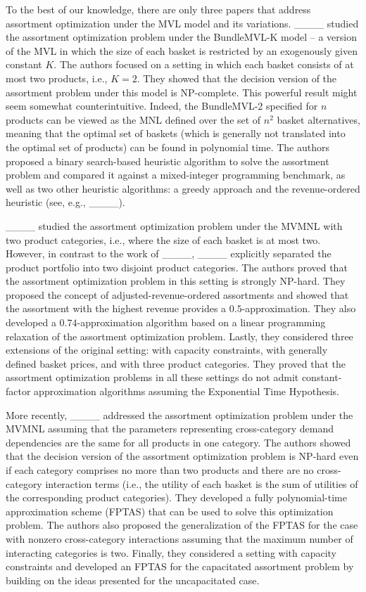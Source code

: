 To the best of our knowledge, there are only three papers that address assortment optimization under the MVL model and its variations. ____ studied the assortment optimization problem under the BundleMVL-K model -- a version of the MVL in which the size of each basket is restricted by an exogenously given constant $K$. The authors focused on a setting in which each basket consists of at most two products, i.e., $K=2$. They showed that the decision version of the assortment problem under this model is NP-complete. This powerful result might seem somewhat counterintuitive. Indeed, the BundleMVL-2 specified for $n$ products can be viewed as the MNL defined over the set of $n^2$ basket alternatives, meaning that the optimal set of baskets (which is generally not translated into the optimal set of products) can be found in polynomial time. The authors proposed a binary search-based heuristic algorithm to solve the assortment problem and compared it against a mixed-integer programming benchmark, as well as two other heuristic algorithms: a greedy approach and the revenue-ordered heuristic (see, e.g., ____). 
 
 ____ studied the assortment optimization problem under the MVMNL with two product categories, i.e., where the size of each basket is at most two. However, in contrast to the work of ____, ____ explicitly separated the product portfolio into two disjoint product categories. The authors proved that the assortment optimization problem in this setting is strongly NP-hard. They proposed the concept of adjusted-revenue-ordered assortments and showed that the assortment with the highest revenue provides a $0.5$-approximation. 
They also developed a $0.74$-approximation algorithm based on a linear programming relaxation of the assortment optimization problem. Lastly, they considered three extensions of the original setting: with capacity constraints, with generally defined basket prices, and with three product categories. They proved that the assortment optimization problems in all these settings do not admit constant-factor approximation algorithms assuming the Exponential Time Hypothesis.

More recently, ____ addressed the assortment optimization problem under the MVMNL assuming that the parameters representing cross-category demand dependencies are the same for all products in one category. The authors showed that 
 the decision version of the assortment optimization problem is NP-hard even if each category comprises no more than two products and there are no cross-category interaction terms (i.e., the utility of each basket is the sum of utilities of the corresponding product categories). They developed a fully polynomial-time approximation scheme (FPTAS) that can be used to solve this optimization problem. The authors also proposed the generalization of the FPTAS for the case with nonzero cross-category interactions assuming that the maximum number of interacting categories is two. Finally, they considered a setting with capacity constraints and developed an FPTAS for the capacitated assortment problem by building on the ideas presented for the uncapacitated case. 




